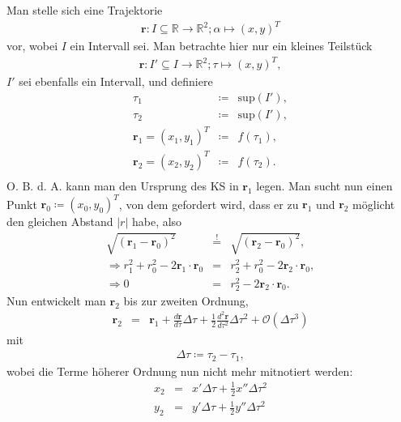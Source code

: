\documentclass{book}
\newcommand{\hastobe}{\stackrel{!}{=}}
\renewcommand{\sup}{\text{sup}}
\begin{document}
Man stelle sich eine Trajektorie 
%
\begin{eqnarray}
\mathbf{r}:I\subseteq\mathbb{R}\to\mathbb{R}^2;\alpha\mapsto\left(x, y\right)^T
\end{eqnarray}
%
vor, wobei $I$ ein Intervall sei. Man betrachte hier nur ein kleines Teilstück
%
\begin{eqnarray}
\mathbf{r}:I'\subseteq I\to\mathbb{R}^2;\tau\mapsto\left(x, y\right)^T, 
\end{eqnarray}
%
$I'$ sei ebenfalls ein Intervall, und definiere
%
\begin{eqnarray}
\tau_1 & \coloneqq & \sup\left(I'\right),\\ 
\tau_2 & \coloneqq & \sup\left(I'\right),\\ 
\mathbf{r}_1 = \left(x_1, y_1\right)^T & \coloneqq & f\left(\tau_1\right),\\
\mathbf{r}_2 = \left(x_2, y_2\right)^T & \coloneqq & f\left(\tau_2\right).\\
\end{eqnarray}
%
O. B. d. A. kann man den Ursprung des KS in $\mathbf{r}_1$ legen. Man sucht nun einen Punkt $\mathbf{r}_0 \coloneqq \left(x_0, y_0\right)^T$, von dem gefordert wird, dass er zu $\mathbf{r}_1$ und $\mathbf{r}_2$ möglicht den gleichen Abstand $\left|r\right|$ habe, also
%
\begin{eqnarray}
\sqrt{\left(\mathbf{r}_1 - \mathbf{r}_0\right)^2} & \hastobe & \sqrt{\left(\mathbf{r}_2 - \mathbf{r}_0\right)^2},\\
\Rightarrow r_1^2 + r_0^2 - 2\mathbf{r}_1\cdot\mathbf{r}_0 & = & r_2^2 + r_0^2 - 2\mathbf{r}_2\cdot\mathbf{r}_0,\\
\Rightarrow 0 & = & r_2^2 - 2\mathbf{r}_2\cdot\mathbf{r}_0.\label{eq:deriv_curv_1}
\end{eqnarray}
%
Nun entwickelt man $\mathbf{r}_2$ bis zur zweiten Ordnung, 
%
\begin{eqnarray}
\mathbf{r}_2 & = & \mathbf{r}_1 + \frac{d\mathbf{r}}{d\tau}\Delta\tau + \frac{1}{2}\frac{d^2\mathbf{r}}{d\tau^2}\Delta\tau^2 + \mathcal{O}\left(\Delta\tau^3\right)
\end{eqnarray}
%
mit
%
\begin{eqnarray}
\Delta\tau \coloneqq \tau_2 - \tau_1, 
\end{eqnarray}
%
wobei die Terme höherer Ordnung nun nicht mehr mitnotiert werden:
%
\begin{eqnarray}
x_2 & = & x'\Delta\tau + \frac{1}{2}x''\Delta\tau^2\\
y_2 & = & y'\Delta\tau + \frac{1}{2}y''\Delta\tau^2
\end{eqnarray}
\end{document}
